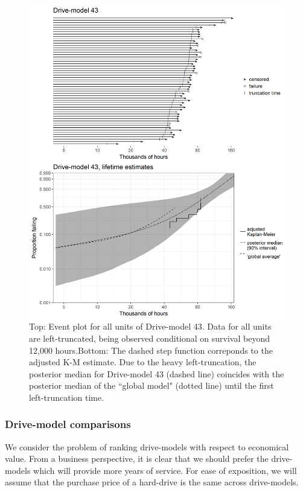\documentclass[aap]{imsart}
\begin{document}
\begin{figure}
\centering
\includegraphics[height=.8\textheight]{dm43-shrinkage.png}
\caption{\footnotesize Top: Event plot for all units of Drive-model 43. Data for all units are left-truncated, being observed conditional on survival beyond 12,000 hours.\hspace{\textwidth}Bottom: The dashed step function correponds to the adjusted K-M estimate. Due to the heavy left-truncation, the posterior median for Drive-model 43 (dashed line) coincides with the posterior median of the ``global model" (dotted line) until the first left-truncation time.}
\label{fig:ex-mod-43}
\end{figure}

\subsubsection{Drive-model comparisons}
\label{subsubsec:Drive-model comparisons}
We consider the problem of ranking drive-models with respect to economical value. From a
business perspective, it is clear
that we should prefer the drive-models which will provide more years
of service. For ease of exposition, we will assume that the purchase
price of a hard-drive is the same across drive-models.
\end{document}
